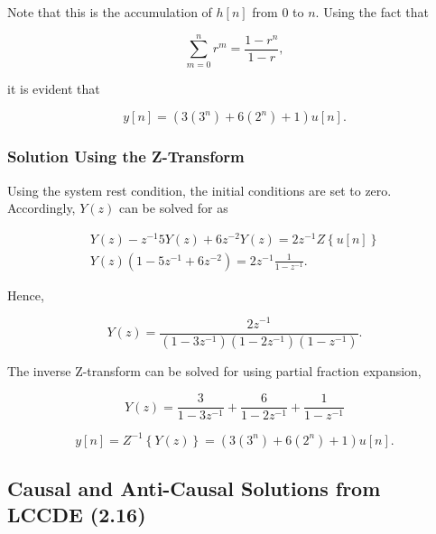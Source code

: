 Note that this is the accumulation of $h[n]$ from 0 to $n$. Using the fact that

\begin{equation}
    \sum\limits_{m = 0}^n {{r^m}}  = \frac{{1 - {r^n}}}{{1 - r}},
\end{equation}

it is evident that

\begin{equation}
    y[n] = \left(3 \left(3^n\right) + 6 \left(2^n\right) + 1 \right)u[n].
\end{equation}

\subsubsection{Solution Using the Z-Transform}

Using the system rest condition, the initial conditions are set to zero. Accordingly, $Y(z)$ 
can be solved for as

\begin{equation}
    \begin{aligned}
        Y(z) - {z^{ - 1}}5Y(z) + 6{z^{ - 2}}Y(z) = 2{z^{ - 1}}Z\left\{ {u[n]} \right\}\\
        Y(z)\left( {1 - 5{z^{ - 1}} + 6{z^{ - 2}}} \right) = 2{z^{ - 1}}\frac{1}{{1 - {z^{ - 1}}}}.
        \end{aligned}
\end{equation}


Hence,

\begin{equation}
    Y(z) = \frac{{2{z^{ - 1}}}}{{\left( {1 - 3{z^{ - 1}}} \right)\left( {1 - 2{z^{ - 1}}} \right)\left( {1 - {z^{ - 1}}} \right)}}.
\end{equation}

The inverse Z-transform can be solved for using partial fraction expansion,

\begin{equation}
Y(z) = \frac{3}{{1 - 3{z^{ - 1}}}} + \frac{6}{{1 - 2{z^{ - 1}}}} + \frac{1}{{1 - {z^{ - 1}}}}
\end{equation}

\begin{equation}
    y[n] = {Z^{ - 1}}\left\{ {Y(z)} \right\} = \left( {3\left( {{3^n}} \right) + 6\left( {{2^n}} \right) + 1} \right)u[n].
\end{equation}


\subsection{Causal and Anti-Causal Solutions from LCCDE (2.16)}

